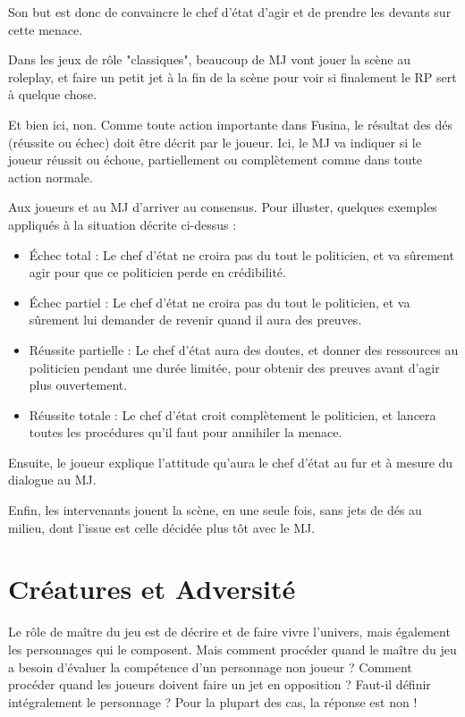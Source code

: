 \documentclass{conf/FusinaClass}
\begin{document}
Son but est donc de convaincre le chef d'état d'agir et de prendre les devants sur cette menace. 

Dans les jeux de rôle "classiques", beaucoup de MJ vont jouer la scène au roleplay, et faire un petit jet à la fin de la scène pour voir si finalement le RP sert à quelque chose.

Et bien ici, non. Comme toute action importante dans Fusina, le résultat des dés (réussite ou échec) doit être décrit par le joueur. Ici, le MJ va indiquer si le joueur réussit ou échoue, partiellement ou complètement comme dans toute action normale.

Aux joueurs et au MJ d'arriver au consensus. Pour illuster, quelques exemples appliqués à la situation décrite ci-dessus :

\begin{itemize}
\item Échec total : Le chef d'état ne croira pas du tout le politicien, et va sûrement agir pour que ce politicien perde en crédibilité.
\item Échec partiel : Le chef d'état ne croira pas du tout le politicien, et va sûrement lui demander de revenir quand il aura des preuves.
\item Réussite partielle : Le chef d'état aura des doutes, et donner des ressources au politicien pendant une durée limitée, pour obtenir des preuves avant d'agir plus ouvertement.
\item Réussite totale : Le chef d'état croit complètement le politicien, et lancera toutes les procédures qu'il faut pour annihiler la menace.
\end{itemize}

Ensuite, le joueur explique l'attitude qu'aura le chef d'état au fur et à mesure du dialogue au MJ.

Enfin, les intervenants jouent la scène, en une seule fois, sans jets de dés au milieu, dont l'issue est celle décidée plus tôt avec le MJ.

\chapter{Créatures et Adversité}
Le rôle de maître du jeu est de décrire et de faire vivre l'univers, mais également les personnages qui le composent. Mais comment procéder quand le maître du jeu a besoin d'évaluer la compétence d'un personnage non joueur ? Comment procéder quand les joueurs doivent faire un jet en opposition ? Faut-il définir intégralement le personnage ? Pour la plupart des cas, la réponse est non ! 
\end{document}
